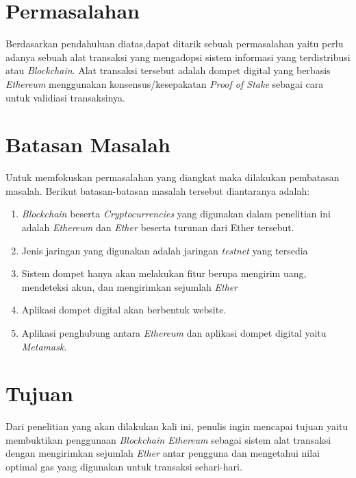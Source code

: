 \section{Permasalahan}
\label{sec:permasalahan}

Berdasarkan pendahuluan diatas,dapat ditarik sebuah permasalahan yaitu perlu adanya sebuah alat transaksi yang mengadopsi sistem informasi yang terdistribusi atau \emph{Blockchain}. Alat transaksi tersebut adalah dompet digital yang berbasis \emph{Ethereum} menggunakan konsensus/kesepakatan \emph{Proof of Stake} sebagai cara untuk validiasi transaksinya.

\section{Batasan Masalah}
\label{sec:batasanmasalah}

Untuk memfokuskan permasalahan yang diangkat maka dilakukan pembatasan masalah. Berikut batasan-batasan masalah tersebut diantaranya adalah:

\begin{enumerate}[nolistsep]

  \item \emph{Blockchain} beserta \emph{Cryptocurrencies} yang digunakan dalam penelitian ini adalah \emph{Ethereum} dan \emph{Ether} beserta turunan dari Ether tersebut.
  \item Jenis jaringan yang digunakan adalah jaringan \emph{testnet} yang tersedia
  \item Sistem dompet hanya akan melakukan fitur berupa mengirim uang, mendeteksi akun, dan mengirimkan sejumlah \emph{Ether}
  \item Aplikasi dompet digital akan berbentuk website.
  \item Aplikasi penghubung antara \emph{Ethereum} dan aplikasi dompet digital yaitu \emph{Metamask}.

\end{enumerate}

\section{Tujuan}
\label{sec:Tujuan}

Dari penelitian yang akan dilakukan kali ini, penulis ingin mencapai tujuan yaitu membuktikan penggunaan \emph{Blockchain Ethereum} sebagai sistem alat transaksi dengan mengirimkan sejumlah \emph{Ether} antar pengguna dan mengetahui nilai optimal gas yang digunakan untuk transaksi sehari-hari.

